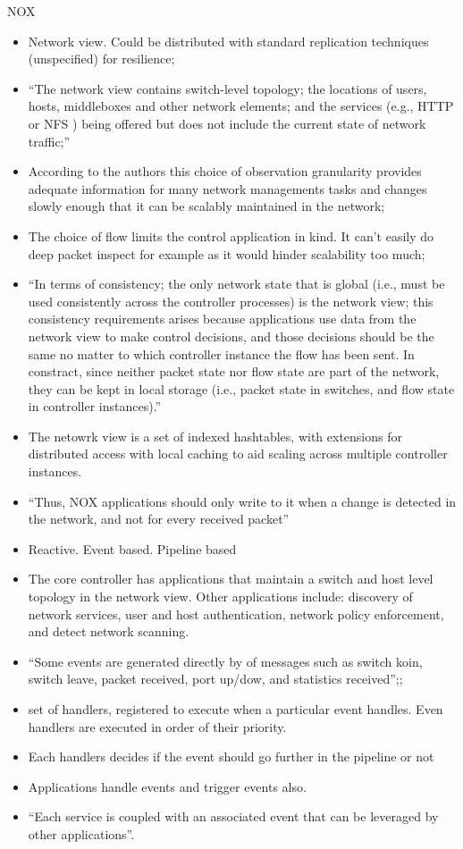 \documentclass[12pt,openright,twoside]{report}
\begin{document}
\begin{itemize}
NOX
\begin{itemize}
\item Network view.  Could be distributed with standard replication techniques (unspecified) for resilience; 
\item ``The network view contains switch-level topology; the locations of users, hosts, middleboxes and other network elements; and the services (e.g., HTTP or NFS )  being offered but does not include the current state of network traffic;''
\item According to the authors this choice of observation granularity provides adequate information for many network managements tasks and changes slowly enough that it can be scalably maintained in the network; 
\item The choice of flow limits the control application in kind. It can't easily do deep packet inspect for example as it would hinder scalability too much; 
\item ``In terms of consistency; the only network state that is global (i.e., must be used consistently across the controller processes) is the network view; this consistency requirements arises because applications use data from the network view to make control decisions, and those decisions should be the same no matter to which controller instance the flow has been sent. In constract, since neither packet state nor flow state are part of the network, they can be kept in local storage (i.e., packet state in switches, and flow state in controller instances).'' 
\item The netowrk view is a set of indexed hashtables, with extensions for distributed access with local caching to aid scaling across multiple controller instances. 
\item ``Thus, NOX applications should only write to it when a change is detected in the network, and not for every received packet'' 

\item Reactive. Event based.   Pipeline based 
\item The core controller has applications that maintain a switch and host level topology in the network view. Other applications include: discovery of network services, user and host authentication, network policy enforcement, and detect network scanning. 
\item ``Some events are generated directly by \gls{of} messages such as switch koin, switch leave, packet received, port up/dow, and statistics received'';;
\item set of handlers, registered to execute when a particular event handles. Even handlers are executed in order of their priority.
\item Each handlers decides if the event should go further in the pipeline or not
\item Applications handle events and trigger events also. 
\item ``Each service is coupled with an associated event that can be leveraged by other applications''. 



\end{itemize}
\end{itemize}
\end{document}
